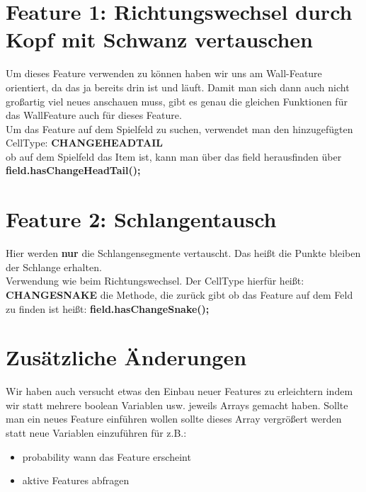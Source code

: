 \documentclass[a4paper]{article}
\begin{document}
\tableofcontents
\section{Feature 1: Richtungswechsel durch Kopf mit Schwanz vertauschen}
Um dieses Feature verwenden zu können haben wir uns am Wall-Feature orientiert, da das ja bereits drin ist und läuft.
Damit man sich dann auch nicht großartig viel neues anschauen muss, gibt es genau die gleichen
Funktionen für das WallFeature auch für dieses Feature.
\\
Um das Feature auf dem Spielfeld zu suchen, verwendet man den hinzugefügten CellType: \textbf{CHANGEHEADTAIL}\\
ob auf dem Spielfeld das Item ist, kann man über das field herausfinden über \textbf{field.hasChangeHeadTail();}\\
\section{Feature 2: Schlangentausch}
Hier werden \textbf{nur} die Schlangensegmente vertauscht. Das heißt die Punkte bleiben der
Schlange erhalten.\\
Verwendung wie beim Richtungswechsel. Der CellType hierfür heißt: \textbf{CHANGESNAKE}
die Methode, die zurück gibt ob das Feature auf dem Feld zu finden ist heißt:
\textbf{field.hasChangeSnake();}\\

\section{Zusätzliche Änderungen}
Wir haben auch versucht etwas den Einbau neuer Features zu erleichtern indem wir statt mehrere boolean Variablen usw. jeweils Arrays gemacht haben. Sollte man ein neues Feature einführen wollen sollte dieses Array vergrößert werden statt neue Variablen einzuführen für z.B.:\\
\begin{itemize}
\item probability wann das Feature erscheint
\item aktive Features abfragen
\end{itemize}
\end{document}
